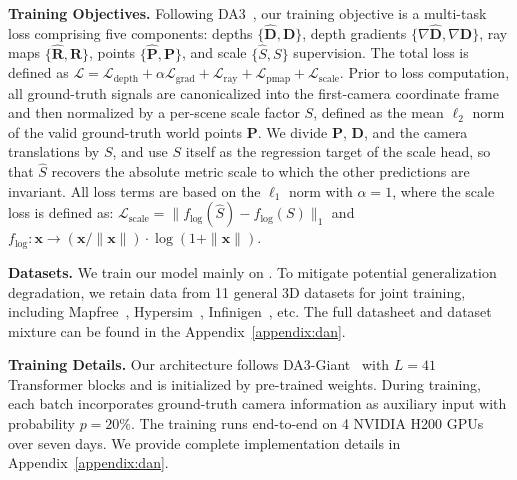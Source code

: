\textbf{Training Objectives.}
Following DA3~\citep{lin2025depth}, our training objective is a multi-task loss comprising five components: depths $\{\hat{\mathbf{D}},\mathbf{D}\}$, depth gradients $\{\nabla\hat{\mathbf{D}},\nabla\mathbf{D}\}$, ray maps $\{\hat{\mathbf{R}},\mathbf{R}\}$, points $\{\hat{\mathbf{P}},\mathbf{P}\}$, and scale $\{\hat{S},S\}$ supervision.
%
The total loss is defined as $\mathcal{L} = \mathcal{L}_{\text{depth}} + \alpha \mathcal{L}_{\text{grad}}+ \mathcal{L}_{\text{ray}} + \mathcal{L}_{\text{pmap}} + \mathcal{L}_{\text{scale}}$.
%
Prior to loss computation, all ground-truth signals are canonicalized into the first-camera coordinate frame and then normalized by a per-scene scale factor $S$, defined as the mean $\ell_2$ norm of the valid ground-truth world points $\mathbf{P}$. We divide $\mathbf{P}$, $\mathbf{D}$, and the camera translations by $S$, and use $S$ itself as the regression target of the scale head, so that $\hat{S}$ recovers the absolute metric scale to which the other predictions are invariant.
%
All loss terms are based on the $\ell_1$ norm with $\alpha=1$, where the scale loss is defined as: $\mathcal{L}_{\text{scale}} = \| f_{\log}(\hat{S}) - f_{\log}(S) \|_1$ and $f_{\log }: \mathbf{x} \rightarrow(\mathbf{x} /\|\mathbf{x}\|) \cdot \log (1+\|\mathbf{x}\|)$.


\textbf{Datasets.} 
We train our model mainly on \dataset.
%
To mitigate potential generalization degradation, we retain data from 11 general 3D datasets for joint training, including Mapfree~\citep{arnold2022mapfree}, Hypersim~\citep{roberts2021hypersim}, Infinigen~\citep{raistrick2024infinigen}, etc.
%
The full datasheet and dataset mixture can be found in the Appendix~\ref{appendix:dan}.

\textbf{Training Details.}
Our \ours architecture follows DA3-Giant~\citep{lin2025depth} with $L = 41$ Transformer blocks and is initialized by pre-trained weights.
%
During training, each batch incorporates ground-truth camera information as auxiliary input with probability $p=20\%$.
%
The training runs end-to-end on 4 NVIDIA H200 GPUs over seven days.
%
We provide complete implementation details in Appendix~\ref{appendix:dan}.

